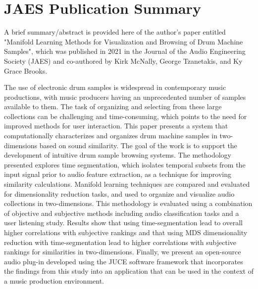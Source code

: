 \chapter{JAES Publication Summary}
\label{appendix:manifold}

A brief summary/abstract is provided here of the author's paper entitled "Manifold Learning Methods for Visualization and Browsing of Drum Machine Samples", which was published in 2021 in the Journal of the Audio Engineering Society (JAES) \cite{shier2021manifold} and co-authored by Kirk McNally, George Tzanetakis, and Ky Grace Brooks.

The use of electronic drum samples is widespread in contemporary music productions, with music producers having an unprecedented number of samples available to them. The task of organizing and selecting from these large collections can be challenging and time-consuming, which points to the need for improved methods for user interaction. This paper presents a system that computationally characterizes and organizes drum machine samples in two-dimensions based on sound similarity. The goal of the work is to support the development of intuitive drum sample browsing systems. The methodology presented explores time segmentation, which isolates temporal subsets from the input signal prior to audio feature extraction, as a technique for improving similarity calculations. Manifold learning techniques are compared and evaluated for dimensionality reduction tasks, and used to organize and visualize audio collections in two-dimensions. This methodology is evaluated using a combination of objective and subjective methods including audio classification tasks and a user listening study. Results show that using time-segmentation lead to overall higher correlations with subjective rankings and that using MDS dimensionality reduction with time-segmentation lead to higher correlations with subjective rankings for similarities in two-dimensions. Finally, we present an open-source audio plug-in developed using the JUCE software framework that incorporates the findings from this study into an application that can be used in the context of a music production environment.